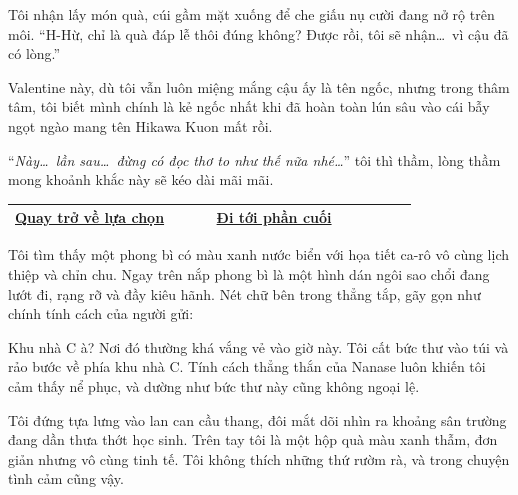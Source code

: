 \documentclass[../main.tex]{subfiles}
\begin{document}
Tôi nhận lấy món quà, cúi gầm mặt xuống để che giấu nụ cười đang nở rộ trên môi. ``H-Hừ, chỉ là quà đáp lễ thôi đúng không? Được rồi, tôi sẽ nhận\dots\ vì cậu đã có lòng.''

Valentine này, dù tôi vẫn luôn miệng mắng cậu ấy là tên ngốc, nhưng trong thâm tâm, tôi biết mình chính là kẻ ngốc nhất khi đã hoàn toàn lún sâu vào cái bẫy ngọt ngào mang tên Hikawa Kuon mất rồi.

``\textit{Này\dots\ lần sau\dots\ đừng có đọc thơ to như thế nữa nhé\dots}'' tôi thì thầm, lòng thầm mong khoảnh khắc này sẽ kéo dài mãi mãi.

\begin{table}[H]
  \centering
  \setlength{\arrayrulewidth}{1pt}
  \begin{tabular}{|>{\centering\arraybackslash}p{0.4\linewidth}|>{\centering\arraybackslash}p{0.4\linewidth}|}
    \hline
    \hyperref[choice]{Quay trở về lựa chọn} & \hyperref[ending]{Đi tới phần cuối} \\ \hline
  \end{tabular}
\end{table}

\newpage
\label{nanase}

Tôi tìm thấy một phong bì có màu xanh nước biển với họa tiết ca-rô vô cùng lịch thiệp và chỉn chu. Ngay trên nắp phong bì là một hình dán ngôi sao chổi đang lướt đi, rạng rỡ và đầy kiêu hãnh. Nét chữ bên trong thẳng tắp, gãy gọn như chính tính cách của người gửi:


Khu nhà C à? Nơi đó thường khá vắng vẻ vào giờ này. Tôi cất bức thư vào túi và rảo bước về phía khu nhà C. Tính cách thẳng thắn của Nanase luôn khiến tôi cảm thấy nể phục, và dường như bức thư này cũng không ngoại lệ.

\ct


Tôi đứng tựa lưng vào lan can cầu thang, đôi mắt dõi nhìn ra khoảng sân trường đang dần thưa thớt học sinh. Trên tay tôi là một hộp quà màu xanh thẫm, đơn giản nhưng vô cùng tinh tế. Tôi không thích những thứ rườm rà, và trong chuyện tình cảm cũng vậy.
\end{document}

